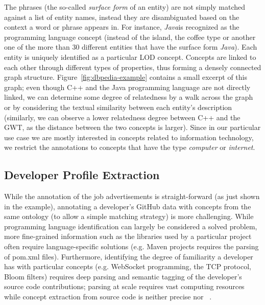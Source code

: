\documentclass[conference]{IEEEtran}
\begin{document}
The
phrases (the so-called \emph{surface form} of an entity) are not simply matched
against a list of entity names, instead they are disambiguated based on the
context a word or phrase appears in. For instance, \emph{Java}is recognized as
the programming language concept (instead of the island, the coffee type or
another one of the more than 30 different entities that have the surface form
\emph{Java}). Each entity is uniquely identified as a particular LOD concept.
Concepts are linked to each other through different types
of properties, thus forming a densely connected graph structure.
Figure~\ref{fig:dbpedia-example} contains a small excerpt of this graph; even
though C++ and the Java programming language are not directly linked, we can
determine some degree of relatedness by a walk across the graph or by considering the textual similarity between each entity's description~\cite{gabrilovich2007computing} (similarly, we
can observe a lower relatedness degree between C++ and the GWT, as the distance
between the two concepts is larger). Since in our particular use
case we are mostly interested in concepts related to information technology, we
restrict the annotations to concepts that have the type \emph{computer} or
\emph{internet}.

\subsection{Developer Profile Extraction}

While the annotation of the job advertisements is straight-forward (as just shown in the example), annotating a developer's GitHub data with concepts from the same ontology (to allow a simple
matching strategy) is more challenging. While programming language
identification can largely be considered a solved problem, more fine-grained
information such as the libraries used by a particular project often require
language-specific solutions (e.g. Maven projects requires the parsing of
\textsf{pom.xml} files). Furthermore, identifying the degree of familiarity a
developer has with particular concepts (e.g. WebSocket programming, the TCP
protocol, Bloom filters) requires deep parsing and semantic tagging of the
developer's source code contributions; parsing at scale requires vast computing
resources while concept extraction from source code is neither precise nor ~\cite{Kuhn07}.
\end{document}
